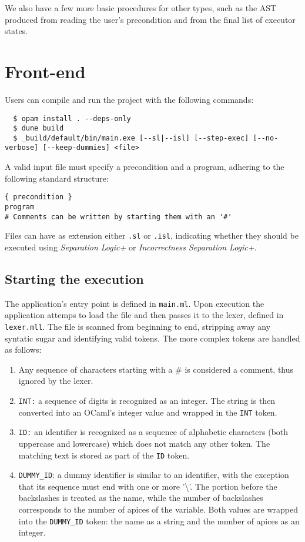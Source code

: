 \documentclass[parskip=half]{scrartcl}
\begin{document}
We also have a few more basic procedures for other types, such as the AST produced from reading the user's precondition and from the final list of executor states.

\section{Front-end}
Users can compile and run the project with the following commands:
\begin{verbatim}
  $ opam install . --deps-only
  $ dune build
  $ _build/default/bin/main.exe [--sl|--isl] [--step-exec] [--no-verbose] [--keep-dummies] <file>
\end{verbatim}

A valid input file must specify a precondition and a program, adhering to the following standard structure:

\begin{verbatim}
{ precondition }
program
# Comments can be written by starting them with an '#'
\end{verbatim}

Files can have as extension either \texttt{.sl} or \texttt{.isl}, 
indicating whether they should be executed using 
\textit{Separation Logic+} or \textit{Incorrectness Separation Logic+}.

\subsection{Starting the execution}
The application's entry point is defined in \texttt{main.ml}.
Upon execution the application attemps to load the file and then passes it to the lexer, defined in \texttt{lexer.mll}. 
The file is scanned from beginning to end, stripping away any syntatic sugar and identifying valid tokens.
The more complex tokens are handled as follows:

\begin{enumerate}
  \item Any sequence of characters starting with a \# is considered a comment, thus ignored by the lexer.
  
  \item \texttt{INT:} a sequence of digits is recognized as an integer. 
  The string is then converted into an OCaml's integer value and wrapped in the \texttt{INT} token.
      

  \item \texttt{ID:} an identifier is recognized as a sequence of alphabetic characters (both uppercase and lowercase) which does not match any other token. 
        The matching text is stored as part of the \texttt{ID} token.
  
  \item \texttt{DUMMY\_ID}: a dummy identifier is similar to an identifier, with the exception that
        its sequence must end with one or more '\textbackslash{}'.
        The portion before the backslashes is treated as the name, while the number of backslashes corresponds to the number of apices of the variable.
        Both values are wrapped into the \texttt{DUMMY\_ID} token: the name as a string and the number of apices as an integer.
\end{enumerate}
\end{document}
